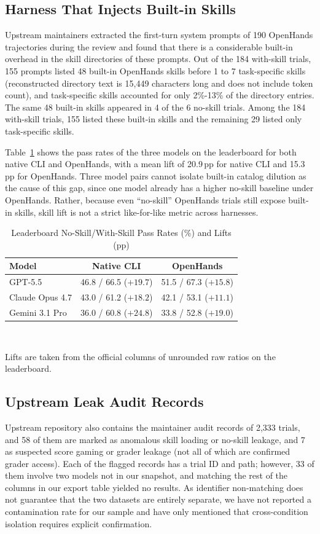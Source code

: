 \documentclass[10pt,conference]{IEEEtran}
\newif\ifkeepcuts \keepcutstrue
\newcommand{\cut}[1]{\ifkeepcuts #1\fi}
\begin{document}
\subsection{Harness That Injects Built-in Skills}
Upstream maintainers extracted the first-turn system prompts of 190 OpenHands trajectories during the review\cut{ and found that there is a considerable built-in overhead in the skill directories of these prompts}. Out of the 184 with-skill trials, 155 prompts listed 48 built-in OpenHands skills before 1 to 7 task-specific skills (reconstructed directory text is 15,449 characters long and does not include token count), and task-specific skills accounted for only 2\%-13\% of the directory entries. The same 48 built-in skills appeared in 4 of the 6 no-skill trials. Among the 184 with-skill trials, 155 listed these built-in skills and the remaining 29 listed only task-specific skills.

Table~\ref{tab:harness} shows the pass rates of the three models on the leaderboard for both native CLI and OpenHands, with a mean lift of 20.9\,pp for native CLI and 15.3\,pp for OpenHands. Three model pairs cannot isolate built-in catalog dilution as the cause of this gap, since one model already has a higher no-skill baseline under OpenHands. Rather, because even ``no-skill'' OpenHands trials still expose built-in skills, skill lift is not a strict like-for-like metric across harnesses.

\begin{table}[t]
\caption{Leaderboard No-Skill/With-Skill Pass Rates (\%) and Lifts (pp)}
\label{tab:harness}
\centering
\begin{tabular}{@{}lcc@{}}
\toprule
Model & Native CLI & OpenHands \\
\midrule
GPT-5.5 & 46.8 / 66.5 ($+19.7$) & 51.5 / 67.3 ($+15.8$) \\
Claude Opus 4.7 & 43.0 / 61.2 ($+18.2$) & 42.1 / 53.1 ($+11.1$) \\
Gemini 3.1 Pro & 36.0 / 60.8 ($+24.8$) & 33.8 / 52.8 ($+19.0$) \\
\bottomrule
\end{tabular}\\[2pt]
\parbox{\columnwidth}{\footnotesize Lifts are taken from the official columns of unrounded raw ratios on the leaderboard.}
\end{table}

\subsection{Upstream Leak Audit Records}
Upstream repository also contains the maintainer audit records of 2,333 trials, and 58 of them are marked as anomalous skill loading or no-skill leakage, and 7 as suspected score gaming or grader leakage (not all of which are confirmed grader access). Each of the flagged records has a trial ID and path; however, 33 of them involve two models not in our snapshot, and matching the rest of the columns in our export table yielded no results. As identifier non-matching does not guarantee that the two datasets are entirely separate, we have not reported a contamination rate for our sample and have only mentioned that cross-condition isolation requires explicit confirmation.
\end{document}
